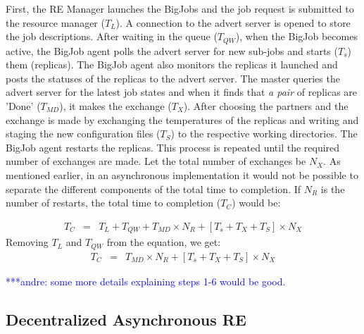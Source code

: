 \documentclass{rspublic}
\newcommand{\alnote}[1]{ {\textcolor{blue} { ***andre: #1 }}}
\newcommand{\alnote}[1]{}
\begin{document}
First, the RE Manager launches the BigJobs and the job request is submitted to the resource manager ($T_{L}$). A connection to the advert server is opened to store the job descriptions. 
After waiting in the queue ($T_{QW}$), when the BigJob becomes active, 
the BigJob agent polls the advert server for new sub-jobs 
and starts ($T_{s}$) them (replicas). The BigJob agent also monitors the 
replicas it launched and posts the statuses of the replicas to the advert 
server. The master queries the advert server for the latest job 
states and when it finds that \emph{a pair} of replicas are 'Done' ($T_{MD}$), it 
makes the exchange ($T_{X}$). After choosing the partners and the exchange is made by exchanging the temperatures of the replicas and writing and staging the new configuration files ($T_{S}$)
to the respective working directories. The BigJob agent restarts the replicas. This process is repeated until the required number of 
exchanges are made. Let the total number of exchanges be $N_{X}$. As mentioned earlier, in an asynchronous implementation it would not be possible to separate the different components of the total time to completion. If $N_{R}$ is the number of restarts, the total time to completion ($T_{C}$) would be:

  \begin{eqnarray}
T_{C} &=& T_{L}+T_{QW}+T_{MD} \times N_{R} + [T_{s} + T_{X}+T_{S}] \times N_{X}
\label{eq:equation}
\end{eqnarray}
Removing $T_{L}$ and $T_{QW}$ from the equation, we get:
  \begin{eqnarray}
T_{C} &=& T_{MD} \times N_{R} + [T_{s} + T_{X}+T_{S}] \times N_{X}
\label{eq:equat}
\end{eqnarray}





 \alnote{some more details explaining steps 1-6 would be good.}%

\subsection{Decentralized Asynchronous RE}
\end{document}
